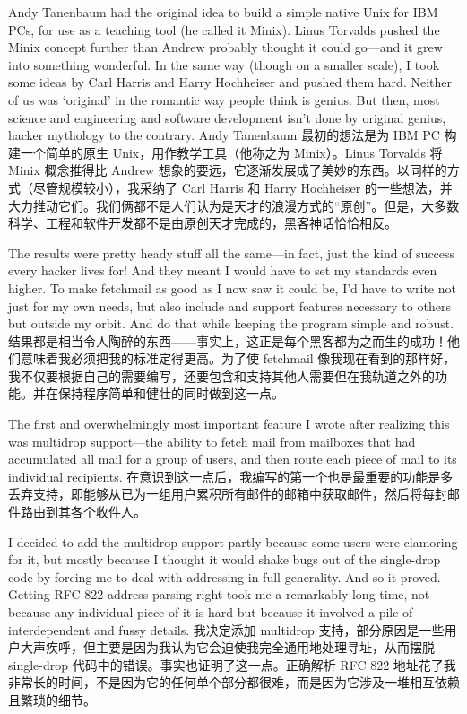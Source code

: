 \documentclass[a4paper,12pt,UTF8,twoside]{ctexbook}
\begin{document}
Andy Tanenbaum had the original idea to build a simple native Unix for IBM PCs, for use as a teaching tool (he called it Minix). Linus Torvalds pushed the Minix concept further than Andrew probably thought it could go—and it grew into something wonderful. In the same way (though on a smaller scale), I took some ideas by Carl Harris and Harry Hochheiser and pushed them hard. Neither of us was `original' in the romantic way people think is genius. But then, most science and engineering and software development isn't done by original genius, hacker mythology to the contrary.
Andy Tanenbaum 最初的想法是为 IBM PC 构建一个简单的原生 Unix，用作教学工具（他称之为 Minix）。Linus Torvalds 将 Minix 概念推得比 Andrew 想象的要远，它逐渐发展成了美妙的东西。以同样的方式（尽管规模较小），我采纳了 Carl Harris 和 Harry Hochheiser 的一些想法，并大力推动它们。我们俩都不是人们认为是天才的浪漫方式的“原创”。但是，大多数科学、工程和软件开发都不是由原创天才完成的，黑客神话恰恰相反。

The results were pretty heady stuff all the same—in fact, just the kind of success every hacker lives for! And they meant I would have to set my standards even higher. To make fetchmail as good as I now saw it could be, I'd have to write not just for my own needs, but also include and support features necessary to others but outside my orbit. And do that while keeping the program simple and robust.
结果都是相当令人陶醉的东西——事实上，这正是每个黑客都为之而生的成功！他们意味着我必须把我的标准定得更高。为了使 fetchmail 像我现在看到的那样好，我不仅要根据自己的需要编写，还要包含和支持其他人需要但在我轨道之外的功能。并在保持程序简单和健壮的同时做到这一点。

The first and overwhelmingly most important feature I wrote after realizing this was multidrop support—the ability to fetch mail from mailboxes that had accumulated all mail for a group of users, and then route each piece of mail to its individual recipients.
在意识到这一点后，我编写的第一个也是最重要的功能是多丢弃支持，即能够从已为一组用户累积所有邮件的邮箱中获取邮件，然后将每封邮件路由到其各个收件人。

I decided to add the multidrop support partly because some users were clamoring for it, but mostly because I thought it would shake bugs out of the single-drop code by forcing me to deal with addressing in full generality. And so it proved. Getting RFC 822 address parsing right took me a remarkably long time, not because any individual piece of it is hard but because it involved a pile of interdependent and fussy details.
我决定添加 multidrop 支持，部分原因是一些用户大声疾呼，但主要是因为我认为它会迫使我完全通用地处理寻址，从而摆脱 single-drop 代码中的错误。事实也证明了这一点。正确解析 RFC 822 地址花了我非常长的时间，不是因为它的任何单个部分都很难，而是因为它涉及一堆相互依赖且繁琐的细节。
\end{document}
